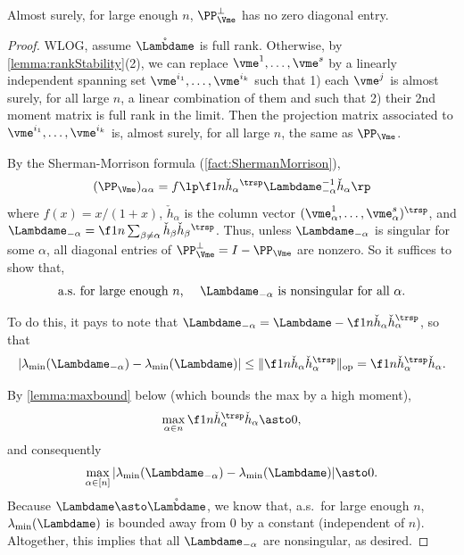 \documentclass[main.tex]{subfiles}
\begin{document}
\begin{lemma}\label{lemma:PiCheckHDiagonal}
Almost surely, for large enough $n$, $\PP_{\Vme}^\perp$ has no zero diagonal entry.
\end{lemma}
\begin{proof}

WLOG, assume $\mathring{\Lambdame }$ is full rank.
Otherwise, by \cref{lemma:rankStability}(2), we can replace $\vme^1,\ldots, \vme^s$ by a linearly independent spanning set $\vme^{i_1}, \ldots, \vme^{i_k}$ such that 1) each $\vme^j$ is almost surely, for all large $n$, a linear combination of them and such that 2) their 2nd moment matrix is full rank in the limit.
Then the projection matrix associated to $\vme^{i_1}, \ldots, \vme^{i_k}$ is, almost surely, for all large $n$, the same as $\PP_{\Vme}$.

By the Sherman-Morrison formula (\cref{fact:ShermanMorrison}),
\begin{equation*}
(\PP_{\Vme})_{\alpha\alpha}
    =
        f\lp \f 1 n \check h_\alpha{}^\trsp \Lambdame_{-\alpha}^{-1} \check h_\alpha\rp
\end{equation*}
where $f(x) = x/(1+x)$, $\check h_\alpha$ is the column vector $(\vme^1_\alpha, \ldots, \vme^s_\alpha)^\trsp$,
and $\Lambdame_{-\alpha} = \f 1 n \sum_{\beta \ne \alpha} \check h_\beta \check h_\beta{}^\trsp$.
Thus, unless $\Lambdame_{-\alpha}$ is singular for some $\alpha$, all diagonal entries of $\PP_{\Vme}^\perp = I - \PP_{\Vme}$ are nonzero.
So it suffices to show that, 
\begin{equation*}
\text{a.s.\ for large enough $n$, \quad $\Lambdame_{-\alpha}$ is nonsingular for all $\alpha$.}
\end{equation*}

To do this, it pays to note that $\Lambdame_{-\alpha} = \Lambdame  - \f 1 n \check h_\alpha \check h_\alpha^\trsp$, so that
\[|\lambda_{\mathrm{min}}(\Lambdame_{-\alpha}) - \lambda_{\mathrm{min}}(\Lambdame )| \le \|\f 1 n \check h_\alpha \check h_\alpha^\trsp\|_{\mathrm{op}} = \f 1 n \check h_\alpha^\trsp \check h_\alpha.\]

By \cref{lemma:maxbound} below (which bounds the max by a high moment),
\[\max_{\alpha \in n} \f 1 n \check h_\alpha^\trsp \check h_\alpha \asto 0,\]
and consequently
\[\max_{\alpha \in [n]} |\lambda_{\mathrm{min}}(\Lambdame_{-\alpha}) - \lambda_{\mathrm{min}}(\Lambdame )| \asto 0.\]
Because $\Lambdame  \asto \mathring{\Lambdame }$, we know that, a.s.\ for large enough $n$, $\lambda_{\mathrm{min}}(\Lambdame )$ is bounded away from 0 by a constant (independent of $n$).
Altogether, this implies that all $\Lambdame_{-\alpha}$ are nonsingular, as desired.
\end{proof}
\end{document}
